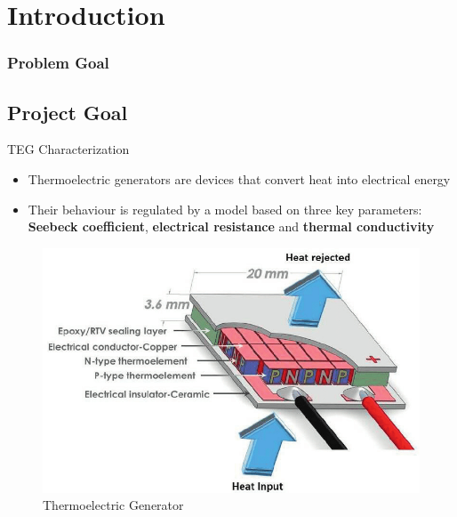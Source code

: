
\section{Introduction}

\begin{frame}
	\frametitle{Problem Goal}

\subsection{Project Goal}
\begin{block}{TEG Characterization}
\begin{itemize}
    \item Thermoelectric generators are devices that convert heat into electrical energy
    \item Their behaviour is regulated by a model based on three key parameters: \textbf{Seebeck coefficient}, \textbf{electrical resistance} and \textbf{thermal conductivity}
\end{itemize}
\end{block}

    \begin{figure}
        \centering
        \includegraphics[scale=0.20]{images/TEG_Example.png}
        \caption{Thermoelectric Generator}
    \end{figure}
\end{frame}

